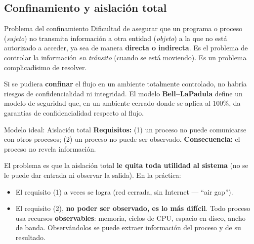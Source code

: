 \documentclass[../main.tex]{subfiles}
\begin{document}
\subsection{Confinamiento y aislación total}

\begin{definicion}{Problema del confinamiento}
Dificultad de asegurar que un programa o proceso (\emph{sujeto}) no transmita
información a otra entidad (\emph{objeto}) a la que no está autorizado a acceder,
ya sea de manera \textbf{directa o indirecta}. Es el problema de controlar la
información \emph{en tránsito} (cuando se está moviendo). Es un problema
complicadísimo de resolver.
\end{definicion}

Si se pudiera \textbf{confinar} el flujo en un ambiente totalmente controlado, no
habría riesgos de confidencialidad ni integridad. El modelo \textbf{Bell--LaPadula}
define un modelo de seguridad que, en un ambiente cerrado donde se aplica al 100\%,
da garantías de confidencialidad respecto al flujo.

\begin{definicion}{Modelo ideal: Aislación total}
\textbf{Requisitos:} (1) un proceso no puede comunicarse con otros procesos;
(2) un proceso no puede ser observado. \textbf{Consecuencia:} el proceso no revela
información.
\end{definicion}


El problema es que la aislación total \textbf{le quita toda utilidad al sistema}
(no se le puede dar entrada ni observar la salida). En la práctica:
\begin{itemize}[noitemsep]
  \item El requisito (1) a veces se logra (red cerrada, sin Internet --- ``air gap'').
  \item El requisito (2), \textbf{no poder ser observado, es lo más difícil}.
        Todo proceso usa recursos \textbf{observables}: memoria, ciclos de CPU,
        espacio en disco, ancho de banda. Observándolos se puede extraer información
        del proceso y de su resultado.
\end{itemize}

\end{document}

